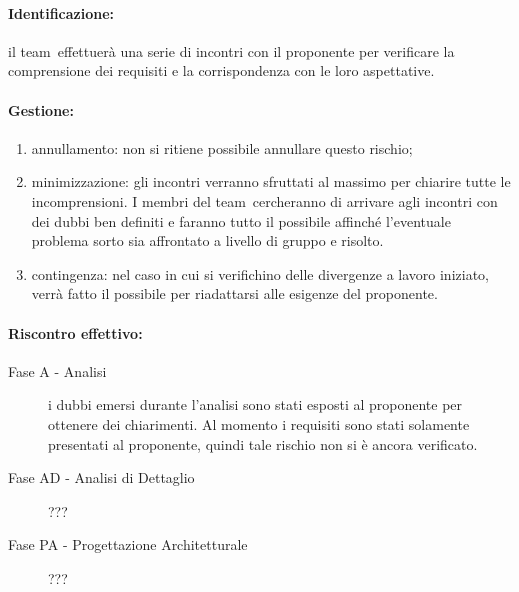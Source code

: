 \documentclass[../PianoProgetto.tex]{subfiles}
\begin{document}
	\paragraph*{Identificazione:} il team\g\ effettuerà una serie di incontri con il proponente per verificare la comprensione dei requisiti e la corrispondenza con le loro aspettative.
	
	\paragraph*{Gestione:}
	\begin{enumerate}
		\item annullamento: non si ritiene possibile annullare questo rischio;
		\item minimizzazione: gli incontri verranno sfruttati al massimo per chiarire tutte le incomprensioni. I membri del team\g\ cercheranno di arrivare agli incontri con dei dubbi ben definiti e faranno tutto il possibile affinché l'eventuale problema sorto sia affrontato a livello di gruppo e risolto.
		\item contingenza: nel caso in cui si verifichino delle divergenze a lavoro iniziato, verrà fatto il possibile per riadattarsi alle esigenze del proponente.
	\end{enumerate}	
	
	\paragraph*{Riscontro effettivo:}
		\begin{description}
			\item[Fase A - Analisi] i dubbi emersi durante l'analisi sono stati esposti al proponente per ottenere dei chiarimenti. Al momento i requisiti sono stati solamente presentati al proponente, quindi tale rischio non si è ancora verificato.
			\item[Fase AD - Analisi di Dettaglio] ???
			\item[Fase PA - Progettazione Architetturale] ???
		\end{description}

			
\end{document}
